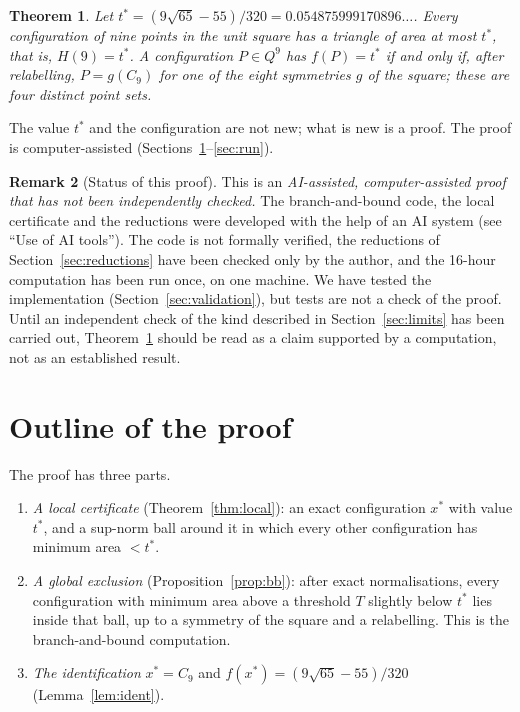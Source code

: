 \documentclass[11pt]{amsart}
\newtheorem{theorem}{Theorem}[section]
\theoremstyle{definition}
\newtheorem{remark}[theorem]{Remark}
\newcommand{\tstar}{t^{*}}
\begin{document}
\begin{theorem}\label{thm:main}
Let $\tstar = (9\sqrt{65}-55)/320 = 0.054875999170896\ldots$. Every configuration of nine points in the unit square has a triangle of area at most $\tstar$, that is, $H(9) = \tstar$. A configuration $P \in Q^9$ has $f(P) = \tstar$ if and only if, after relabelling, $P = g(C_9)$ for one of the eight symmetries $g$ of the square; these are four distinct point sets.
\end{theorem}

The value $\tstar$ and the configuration are not new; what is new is a proof. The proof is computer-assisted (Sections~\ref{sec:outline}--\ref{sec:run}).

\begin{remark}[Status of this proof]\label{rem:status}
This is an \emph{AI-assisted, computer-assisted proof that has not been independently checked.} The branch-and-bound code, the local certificate and the reductions were developed with the help of an AI system (see ``Use of AI tools''). The code is not formally verified, the reductions of Section~\ref{sec:reductions} have been checked only by the author, and the 16-hour computation has been run once, on one machine. We have tested the implementation (Section~\ref{sec:validation}), but tests are not a check of the proof. Until an independent check of the kind described in Section~\ref{sec:limits} has been carried out, Theorem~\ref{thm:main} should be read as a claim supported by a computation, not as an established result.
\end{remark}

\section{Outline of the proof}\label{sec:outline}

The proof has three parts.
\begin{enumerate}[label=(\Alph*)]
\item \emph{A local certificate} (Theorem~\ref{thm:local}): an exact configuration $x^*$ with value $\tstar$, and a sup-norm ball around it in which every other configuration has minimum area $< \tstar$.
\item \emph{A global exclusion} (Proposition~\ref{prop:bb}): after exact normalisations, every configuration with minimum area above a threshold $T$ slightly below $\tstar$ lies inside that ball, up to a symmetry of the square and a relabelling. This is the branch-and-bound computation.
\item \emph{The identification} $x^* = C_9$ and $f(x^*) = (9\sqrt{65}-55)/320$ (Lemma~\ref{lem:ident}).
\end{enumerate}
\end{document}
